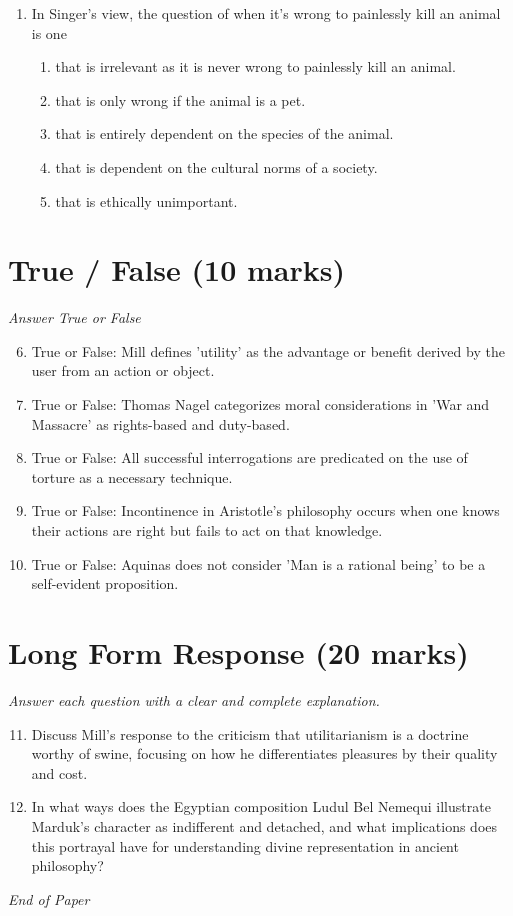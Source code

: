 \documentclass[12pt]{article}
\begin{document}
\begin{enumerate}[label=\arabic*.]
\begin{enumerate}[label=(\alph*)]
    \item the principles dictated by law.
    \item the commands of God.
    \item the principles of our elders.
\end{enumerate}
\item In Singer's view, the question of when it's wrong to painlessly kill an animal is one
\begin{enumerate}[label=(\alph*)]
    \item that is irrelevant as it is never wrong to painlessly kill an animal.
    \item that is only wrong if the animal is a pet.
    \item that is entirely dependent on the species of the animal.
    \item that is dependent on the cultural norms of a society.
    \item that is ethically unimportant.
\end{enumerate}
\end{enumerate}

\section*{True / False (10 marks)}
\textit{Answer True or False}
\begin{enumerate}[label=\arabic*.]
\setcounter{enumi}{5}
\item True or False: Mill defines 'utility' as the advantage or benefit derived by the user from an action or object.
\item True or False: Thomas Nagel categorizes moral considerations in 'War and Massacre' as rights-based and duty-based.
\item True or False: All successful interrogations are predicated on the use of torture as a necessary technique.
\item True or False: Incontinence in Aristotle's philosophy occurs when one knows their actions are right but fails to act on that knowledge.
\item True or False: Aquinas does not consider 'Man is a rational being' to be a self-evident proposition.
\end{enumerate}

\section*{Long Form Response (20 marks)}
\textit{Answer each question with a clear and complete explanation.}
\begin{enumerate}[label=\arabic*.]
\setcounter{enumi}{10}
\item Discuss Mill's response to the criticism that utilitarianism is a doctrine worthy of swine, focusing on how he differentiates pleasures by their quality and cost.
\item In what ways does the Egyptian composition Ludul Bel Nemequi illustrate Marduk's character as indifferent and detached, and what implications does this portrayal have for understanding divine representation in ancient philosophy?
\end{enumerate}

\vfill
\noindent\textit{End of Paper}
\end{document}
